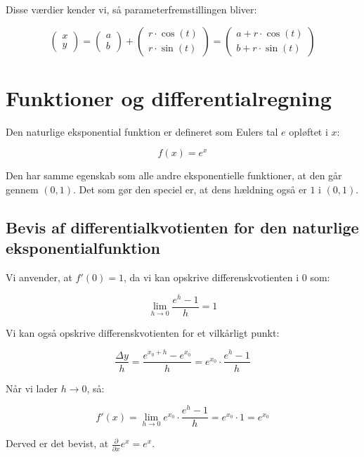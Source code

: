 \documentclass{article}
\makeatletter
\newenvironment{proofw}{\par
  \pushQED{\qed}%
  \normalfont \topsep6\p@\@plus6\p@\relax
  \trivlist
  \item[]\ignorespaces
}{%
  \popQED\endtrivlist\@endpefalse
}
\makeatother
\begin{document}
\begin{proofw}
    Disse værdier kender vi, så parameterfremstillingen bliver:

    $$
    \begin{pmatrix}
        x \\ y
    \end{pmatrix}
    =\begin{pmatrix}
        a \\ b
    \end{pmatrix}
    +
    \begin{pmatrix}
        r \cdot \cos(t)
        \\
        r \cdot \sin(t)
    \end{pmatrix}
    =\begin{pmatrix}
        a+ r \cdot \cos(t)
        \\
        b+ r \cdot \sin(t)
    \end{pmatrix}
    $$

\end{proofw}

\section{Funktioner og differentialregning}

Den naturlige eksponential funktion er defineret som Eulers tal $e$ opløftet i $x$:

$$f(x)=e^x$$

Den har samme egenskab som alle andre eksponentielle funktioner, at den går gennem $(0,1)$.
Det som gør den speciel er, at dens hældning også er $1$ i $(0,1)$.

\subsection{Bevis af differentialkvotienten for den naturlige eksponentialfunktion}
\begin{proofw}
    Vi anvender, at $f'(0)=1$, da vi kan opskrive differenskvotienten i $0$ som:

    $$
    \lim_{h \rightarrow 0}
    \frac{e^h-1}{h}=1
    $$

    Vi kan også opskrive differenskvotienten for et vilkårligt punkt:

    $$
        \frac{\Delta y}{h}=\frac{e^{x_0+h}-e^{x_0}}{h}=e^{x_0}\cdot \frac{e^h-1}{h}
    $$

    Når vi lader $h \rightarrow 0$, så:

    $$
       f'(x)= \lim_{h \rightarrow 0} e^{x_0} \cdot \frac{e^h-1}{h}=e^{x_0} \cdot 1=e^{x_0}
    $$

    Derved er det bevist, at $\frac{\partial}{\partial x} e^x=e^x$.
\end{proofw}
\end{document}
